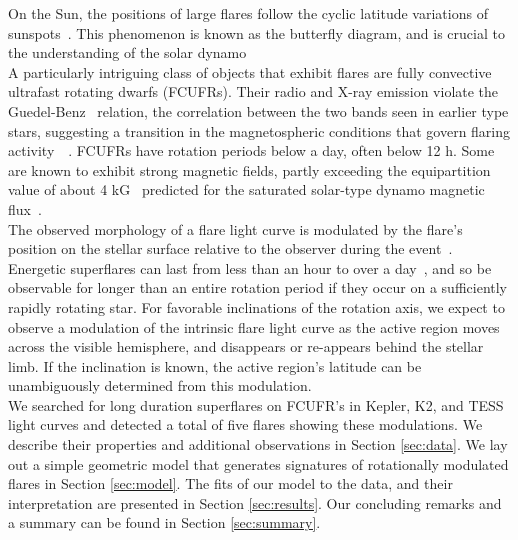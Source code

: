 \documentclass[fleqn,usenatbib,letters]{mnras}%
\begin{document}
On the Sun, the positions of large flares follow the cyclic latitude variations of sunspots~\citep{zhang2007}. This phenomenon is known as the butterfly diagram, and is crucial to the understanding of the solar dynamo~\citep{gnevyshev1977}
\\
A particularly intriguing class of objects that exhibit flares are fully convective ultrafast rotating dwarfs (FCUFRs). Their radio and X-ray emission violate the Guedel-Benz~\citep{guedel1993, benz1994} relation, the correlation between the two bands seen in earlier type stars, suggesting a transition in the magnetospheric conditions that govern flaring activity~~\citep{berger2010, mclean2012, cook2014, williams2014}. FCUFRs have rotation periods below a day, often below 12 h. Some are known to exhibit strong magnetic fields, partly exceeding the equipartition value of about 4 kG~\citep{shulyak2017} predicted for the saturated solar-type dynamo magnetic flux~\citep{pevtsov2003}. %
\\
The observed morphology of a flare light curve is modulated by the flare's position on the stellar surface relative to the observer during the event~\citep{tovmassian2003}. Energetic superflares can last from less than an hour to over a day~\citep{kowalski2013,paudel2018b}, and so be observable for longer than an entire rotation period if they occur on a sufficiently rapidly rotating star. For favorable inclinations of the rotation axis, we expect to observe a modulation of the intrinsic flare light curve as the active region moves across the visible hemisphere, and disappears or re-appears behind the stellar limb. If the inclination is known, the active region's latitude can be unambiguously determined from this modulation.
\\
We searched for long duration superflares on FCUFR's in Kepler, K2, and TESS light curves and detected a total of five flares showing these modulations. We describe their properties and additional observations in Section \ref{sec:data}. We lay out a simple geometric model that generates signatures of rotationally modulated flares in Section \ref{sec:model}. The fits of our model to the data, and their interpretation are presented in Section \ref{sec:results}. Our concluding remarks and a summary can be found in Section \ref{sec:summary}.
\end{document}
